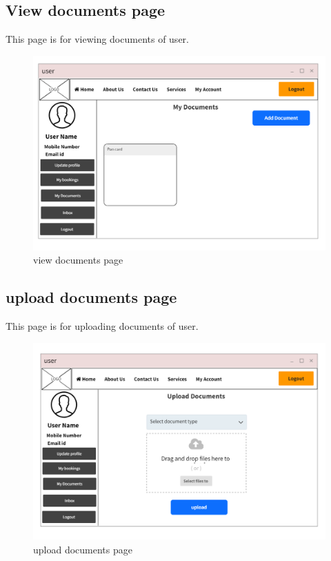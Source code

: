 \documentclass[a4paper,12pt,toc=flat]{report}
\begin{document}
	\pagebreak
	
	
		\subsection{View documents page}
\hspace*{12pt}
        This page is for viewing  documents  of user.
	\begin{figure}[bph]
	\begin{center}
		\includegraphics[width=1.1 \linewidth, height=0.7\textheight]{"user_docs.png"}
	\end{center}
		\caption{ view documents page}
	\end{figure}

	\pagebreak
	
		\subsection{upload documents page}
\hspace*{12pt}
        This page is for uploading  documents  of user.
	\begin{figure}[bph]
	\begin{center}
		\includegraphics[width=1.1 \linewidth, height=0.7\textheight]{"user_upload.png"}
	\end{center}
		\caption{ upload documents page}
	\end{figure}
\end{document}
